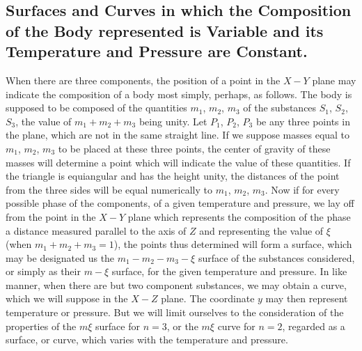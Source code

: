 \documentclass[12pt]{memoir}
\begin{document}
\subsection{Surfaces and Curves in which the Composition of the Body represented is Variable and its Temperature and Pressure are Constant.}
When there are three components, the position of a point in the
$X\!-Y$ plane may indicate the composition of a body most simply, perhaps, as follows. The body is supposed to be composed of the quantities $m_1$, $m_2$, $m_3$
of the substances $S_1$, $S_2$, $S_3$, the value of $m_1 + m_2 + m_3$
being unity. Let $P_1$, $P_2$, $P_3$ be any three points in the plane, which are not in the same straight line. If we suppose masses equal to $m_1$, $m_2$, $m_3$ to be placed at these three points, the center of gravity of these masses will determine a point which will indicate the value of these quantities. If the triangle is equiangular and has the height unity, the distances of the point from the three sides will be equal numerically to $m_1$, $m_2$, $m_3$.
Now if for every possible phase of the components, of a given temperature and pressure, we lay off from the point in the $X\!-Y$ plane which represents the composition of the phase a distance measured parallel to the axis of $Z$ and representing the value of $\xi$ (when $m_1 + m_2 + m_3 = 1$), the points thus determined will form a surface, which may be designated us the $m_1 \! - m_2 \! - m_3 \! - \xi$ surface of the substances considered, or simply as their $m \! - \xi$ surface, for the given temperature and pressure. In like manner, when there are but two component substances, we may obtain a curve, which we will suppose in the $X\!-\!Z$ plane. The coordinate $y$ may then represent temperature or pressure. But we will limit ourselves to the consideration of the properties of the $m\! \xi$ surface for $n= 3$, or the $m\! \xi$ curve for $n = 2$, regarded as a surface, or curve, which varies with the temperature and pressure.
\end{document}
